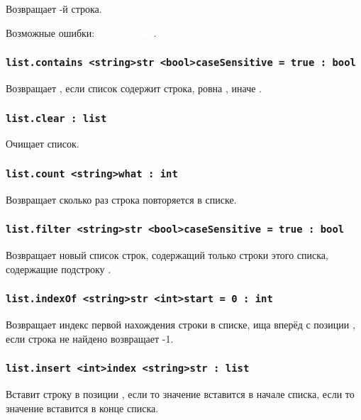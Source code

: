 \documentclass[a4paper, 14pt]{extarticle}
\newcommand{\ferror}[1]{{\fontsize{11pt}{12pt} \tt \colorbox{function}{\textcolor{white}{#1}}}}
\begin{document}
Возвращает -й строка.

Возможные ошибки: \ferror{OutOfBounds}.

\subsubsection{\lstinline|list.contains <string>str <bool>caseSensitive = true : bool|}

Возвращает \true, если список содержит строка, ровна , иначе \false.

\subsubsection{\lstinline|list.clear : list|}

Очищает список.

\subsubsection{\lstinline|list.count <string>what : int|}

Возвращает сколько раз строка  повторяется в списке.

\subsubsection{\lstinline|list.filter <string>str <bool>caseSensitive = true : bool|}

Возвращает новый список строк, содержащий только строки этого списка, содержащие подстроку . 

\subsubsection{\lstinline|list.indexOf <string>str <int>start = 0 : int|}

Возвращает индекс первой нахождения строки  в списке, ища вперёд с позиции , если строка не найдено возвращает -1.

\subsubsection{\lstinline|list.insert <int>index <string>str : list|}

Вставит строку  в позиции , если  то значение вставится в начале списка, если  то значение вставится в конце списка.
\end{document}
